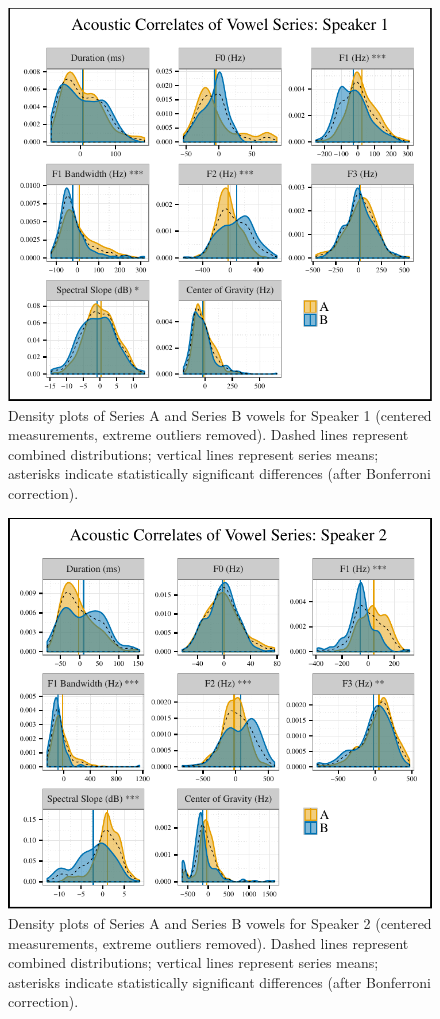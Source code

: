 \documentclass[output=paper
,newtxmath
,modfonts
,nonflat]{langsci/langscibook}
\begin{document}
\begin{figure}[p]
\includegraphics[scale=1]{figures/s1-correlates.pdf}
\caption{Density plots of Series A and Series B vowels for Speaker 1 (centered measurements, extreme outliers removed).  Dashed lines represent combined distributions; vertical lines represent series means; asterisks indicate statistically significant differences (after Bonferroni correction).}
\label{fig:kbgy:1}
\end{figure}



\begin{figure}[p]
\includegraphics[scale=1]{figures/s2-correlates.pdf}
\caption{Density plots of Series A and Series B vowels for Speaker 2 (centered measurements, extreme outliers removed).  Dashed lines represent combined distributions; vertical lines represent series means; asterisks indicate statistically significant differences (after Bonferroni correction).}
\label{fig:kbgy:2}
\end{figure}
\end{document}
